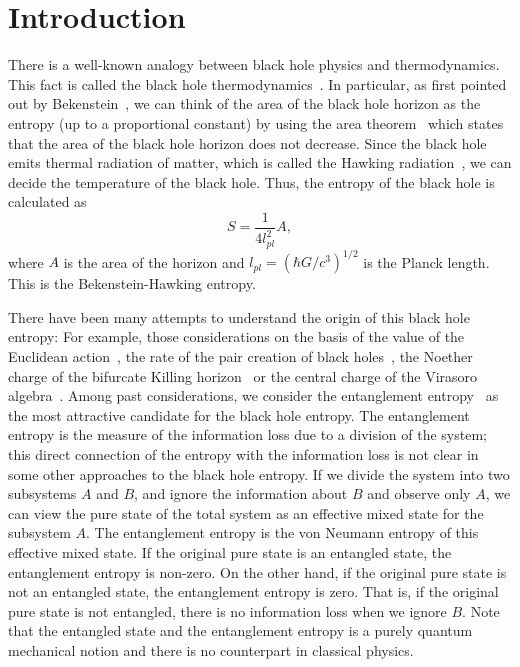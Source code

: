 \section{Introduction}
\label{intro}
There is a well-known analogy between 
black hole physics and thermodynamics.
This fact is called the black hole thermodynamics~\cite{BaCaHa73}.
In particular, as first pointed out
by Bekenstein~\cite{Bekens73},
we can think of the area of the black hole horizon
as the entropy (up to a proportional constant)
by using the area theorem~\cite{AreaTh}
which states that the area of
the black hole horizon does not decrease.
Since the black hole emits thermal radiation of matter,
which is called the Hawking
radiation~\cite{Hawkin75,Wald75,Hawkin76},
we can decide the temperature of the black hole.
Thus, the entropy of the black hole is calculated as
\begin{equation}
  S=\frac{1}{4l^2_{pl}}A,
\label{BH}
\end{equation}
where $A$ is the area of the horizon and 
$l_{pl}=(\hbar G/c^3)^{1/2}$ is the Planck length.
This is the Bekenstein-Hawking entropy.

There have been many attempts
to understand the origin of this black hole entropy:
For example, those considerations on the basis of
the value of the Euclidean
action~\cite{GibHaw77,Hawkin79,BroYor93b,BaTeZa94,HawHun99},
the rate of the pair creation of black holes~\cite{GaGiSt94},
the Noether charge of the bifurcate Killing
horizon~\cite{Wald93,IyeWal94} or
the central charge of the Virasoro
algebra~\cite{Carlip95,Stromi98,Carlip99}.
Among past considerations, we consider the entanglement
entropy~\cite{BKLS86,Sredni93,FroNov93,CalWil94,%
KabStr94,HoLaWi94,MuSeKo97,MuSeKo98,Others}
as the most attractive candidate for the black hole entropy.
The entanglement entropy is the measure of the
information loss due to a division of the system;
this direct connection of the entropy with the information loss
is not clear in some other approaches to the black hole entropy.
If we divide the system into two subsystems $A$ and $B$,
and ignore the information about $B$ and observe only $A$,
we can view the pure state of the total system as
an effective mixed state for the subsystem $A$.
The entanglement entropy is the von Neumann entropy
of this effective mixed state.
If the original pure state is an entangled state,
the entanglement entropy is non-zero.
On the other hand, if the original pure state is not 
an entangled state, the entanglement entropy is zero.
That is, if the original pure state is not entangled,
there is no information loss when we ignore $B$.
Note that the entangled state and the entanglement entropy is
a purely quantum mechanical notion and
there is no counterpart in classical physics.

